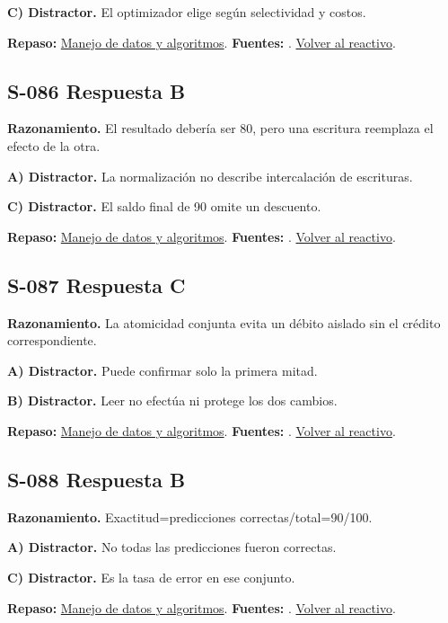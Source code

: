 \textbf{C) Distractor. }El optimizador elige según selectividad y costos.

\textbf{Repaso:} \hyperref[sec:s3]{Manejo de datos y algoritmos}. \textbf{Fuentes:} \cite{postgres}. \hyperref[q:S-085]{Volver al reactivo}.\par\medskip

\subsection*{S-086 \quad Respuesta B}\label{s:S-086}
\textbf{Razonamiento.} El resultado debería ser 80, pero una escritura reemplaza el efecto de la otra.

\textbf{A) Distractor. }La normalización no describe intercalación de escrituras.

\textbf{C) Distractor. }El saldo final de 90 omite un descuento.

\textbf{Repaso:} \hyperref[sec:s3]{Manejo de datos y algoritmos}. \textbf{Fuentes:} \cite{postgres}. \hyperref[q:S-086]{Volver al reactivo}.\par\medskip

\subsection*{S-087 \quad Respuesta C}\label{s:S-087}
\textbf{Razonamiento.} La atomicidad conjunta evita un débito aislado sin el crédito correspondiente.

\textbf{A) Distractor. }Puede confirmar solo la primera mitad.

\textbf{B) Distractor. }Leer no efectúa ni protege los dos cambios.

\textbf{Repaso:} \hyperref[sec:s3]{Manejo de datos y algoritmos}. \textbf{Fuentes:} \cite{postgres}. \hyperref[q:S-087]{Volver al reactivo}.\par\medskip

\subsection*{S-088 \quad Respuesta B}\label{s:S-088}
\textbf{Razonamiento.} Exactitud=predicciones correctas/total=90/100.

\textbf{A) Distractor. }No todas las predicciones fueron correctas.

\textbf{C) Distractor. }Es la tasa de error en ese conjunto.

\textbf{Repaso:} \hyperref[sec:s3]{Manejo de datos y algoritmos}. \textbf{Fuentes:} \cite{algorithms,postgres,ai}. \hyperref[q:S-088]{Volver al reactivo}.\par\medskip

